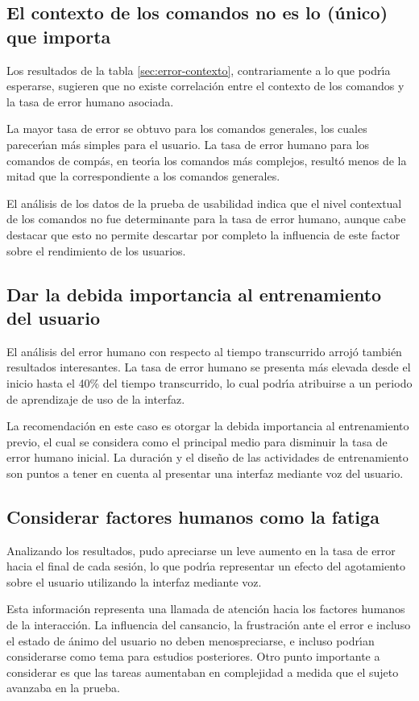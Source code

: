 \subsection{El contexto de los comandos no es lo (\'unico) que importa}
Los resultados de la tabla \ref{sec:error-contexto}, contrariamente a lo que podr{\'\i}a esperarse,
sugieren que no existe correlaci\'on entre el contexto de los comandos y la tasa de error humano asociada.

La mayor tasa de error se obtuvo para los comandos generales, los cuales parecer{\'\i}an m\'as simples 
para el usuario. La tasa de error humano para los comandos de comp\'as, 
en teor{\'\i}a los comandos m\'as complejos,
result\'o menos de la mitad que la correspondiente a los comandos generales.

El an\'alisis de los datos de la prueba de usabilidad indica que el nivel contextual de los comandos no
fue determinante para la tasa de error humano, aunque cabe destacar que esto no permite descartar
por completo la influencia de este factor sobre el rendimiento de los usuarios.


\subsection{Dar la debida importancia al entrenamiento del usuario}
El an\'alisis del error humano con respecto al tiempo transcurrido arroj\'o tambi\'en
resultados interesantes. La tasa de error humano se presenta m\'as elevada desde el inicio hasta
el 40\% del tiempo transcurrido, lo cual podr{{\'\i}}a atribuirse a un periodo de aprendizaje
de uso de la interfaz.

La recomendaci\'on en este caso es otorgar la debida importancia al entrenamiento previo,
el cual se considera como el principal medio para disminuir la tasa de error humano inicial.
La duraci\'on y el dise\~no de las actividades de entrenamiento son puntos a tener en cuenta
al presentar una interfaz mediante voz del usuario.

\subsection{Considerar factores humanos como la fatiga}
Analizando los resultados, pudo apreciarse un leve aumento en la tasa de error hacia el final de
cada sesi\'on, lo que podr{{\'\i}}a representar un efecto del agotamiento sobre el usuario utilizando la
interfaz mediante voz.

Esta informaci\'on representa una llamada de atenci\'on hacia los factores humanos de la interacci\'on.
La influencia del cansancio, la frustraci\'on ante el error e incluso el estado de \'animo
del usuario no deben menospreciarse, e incluso podr{\'\i}an considerarse como tema para estudios
posteriores. Otro punto importante a considerar es que las tareas aumentaban en complejidad a medida que
el sujeto avanzaba en la prueba.


